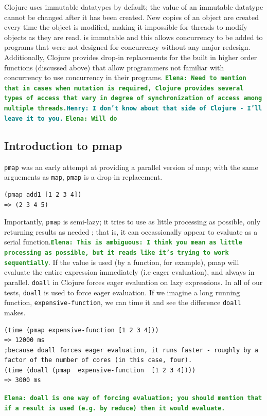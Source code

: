 \documentclass[12pt]{article}
\newcommand{\comment}[1]{{\bf \tt  {#1}}}
\newcommand{\emcomment}[1]{\textcolor{ForestGreen}{\comment{Elena: {#1}}}}
\newcommand{\hfcomment}[1]{\textcolor{Teal}{\comment{Henry: {#1}}}}
\newcommand{\clocode}[1]{{\texttt {#1}}}
\begin{document}
Clojure uses immutable datatypes by default; the value of an immutable datatype cannot be changed after it has been created. New copies of an object are created every time the object is modified, making it impossible for threads to modify objects as they are read. is immutable and this allows concurrency to be added to programs that were not designed for concurrency without any major redesign. Additionally, Clojure provides drop-in replacements for the built in higher order functions (discussed above) that allow programmers not familiar with concurrency to use concurrency in their programs.
\emcomment{Need to mention that in cases when mutation is required, Clojure provides several types of access that vary in degree of synchronization of access among multiple threads.}\hfcomment{I don't know about that side of Clojure - I'll leave it to you.}
\emcomment{Will do}


\subsection{Introduction to pmap}\label{sec:pmap}
\clocode{pmap} was an early attempt at providing a parallel version of map; with the same arguements as \clocode{map}, \clocode{pmap} is a drop-in replacement. 
\begin{verbatim}
(pmap add1 [1 2 3 4])
=> (2 3 4 5)
\end{verbatim}
Importantly, \clocode{pmap} is semi-lazy; it tries to use as little processing as possible, only returning results as needed ; that is, it can occassionally appear to evaluate as a serial function.\emcomment{This is ambiguous: I think you mean as little processing as possible, but it reads like it's trying to work sequentially}. If the value is used (by a function, for example), pmap will evaluate the entire expression immediately (i.e eager evaluation), and always in parallel. \clocode{doall} in Clojure forces eager evaluation on lazy expressions. In all of our tests, \clocode{doall} is used to force eager evaluation. If we imagine a long running function, \clocode{expensive-function}, we can time it and see the difference \clocode{doall} makes.
\begin{verbatim}
(time (pmap expensive-function [1 2 3 4]))
=> 12000 ms 
;because doall forces eager evaluation, it runs faster - roughly by a factor of the number of cores (in this case, four).
(time (doall (pmap  expensive-function  [1 2 3 4])))
=> 3000 ms
\end{verbatim}

 \emcomment{doall is one way of forcing evaluation; you should mention that if a result is used (e.g. by reduce) then it would evaluate. }
\end{document}

